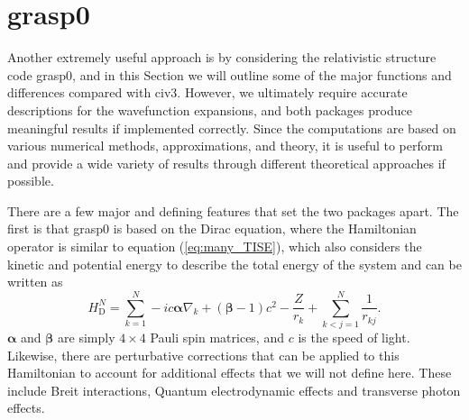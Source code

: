 \section{{\sc grasp0}}\label{sec:many_grasp0}
Another extremely useful approach is by considering the relativistic structure code {\sc grasp0}, and in this Section we will outline some of the major functions and differences compared with {\sc civ3}. However, we ultimately require accurate descriptions for the wavefunction expansions, and both packages produce meaningful results if implemented correctly. Since the computations are based on various numerical methods, approximations, and theory, it is useful to perform and provide a wide variety of results through different theoretical approaches if possible. 

There are a few major and defining features that set the two packages apart. The first is that {\sc grasp0} is based on the Dirac equation, where the Hamiltonian operator is similar to equation (\ref{eq:many_TISE}), which also considers the kinetic and potential energy to describe the total energy of the system and can be written as
\begin{equation}\label{eq:many_dirac_ham}
H^N_{\text{D}} = \sum_{k=1}^N-ic\boldsymbol{\alpha}\nabla_k +(\boldsymbol{\beta}-1)c^2 - \frac{Z}{r_k} + \sum_{k<j=1}^N\frac{1}{r_{kj}}.
\end{equation}
$\boldsymbol{\alpha}$ and $\boldsymbol{\beta}$ are simply $4\times 4$ Pauli spin matrices, and $c$ is the speed of light. Likewise, there are perturbative corrections that can be applied to this Hamiltonian to account for additional effects that we will not define here. These include Breit interactions, Quantum electrodynamic effects and transverse photon effects. 


